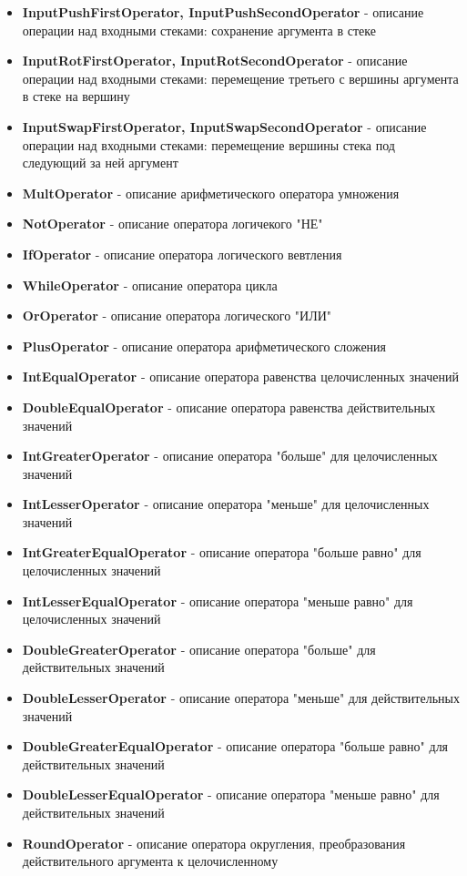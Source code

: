 \documentclass[russian,utf8,emptystyle]{eskdtext}
\begin{document}
\begin{spacing}{1.5}
\begin{itemize}
\item \textbf{InputPushFirstOperator, InputPushSecondOperator} - описание операции над входными стеками: сохранение аргумента в стеке
\item \textbf{InputRotFirstOperator, InputRotSecondOperator} -  описание операции над входными стеками: перемещение третьего с вершины аргумента в стеке на вершину
\item \textbf{InputSwapFirstOperator, InputSwapSecondOperator} - описание операции над входными стеками: перемещение вершины стека под следующий за ней аргумент
\item \textbf{MultOperator} - описание арифметического оператора умножения
\item \textbf{NotOperator} -  описание оператора логичекого "НЕ"
\item \textbf{IfOperator} - описание оператора логического вевтления
\item \textbf{WhileOperator} - описание оператора цикла
\item \textbf{OrOperator} - описание оператора логического "ИЛИ"
\item \textbf{PlusOperator} - описание оператора арифметического сложения
\item \textbf{IntEqualOperator} - описание оператора равенства целочисленных значений
\item \textbf{DoubleEqualOperator} - описание оператора равенства действительных значений
\item \textbf{IntGreaterOperator} - описание оператора "больше" для целочисленных значений
\item \textbf{IntLesserOperator} - описание оператора "меньше" для целочисленных значений
\item \textbf{IntGreaterEqualOperator} - описание оператора "больше равно" для целочисленных значений
\item \textbf{IntLesserEqualOperator} - описание оператора "меньше равно" для целочисленных значений
\item \textbf{DoubleGreaterOperator} - описание оператора "больше" для действительных значений
\item \textbf{DoubleLesserOperator} - описание оператора "меньше" для действительных значений
\item \textbf{DoubleGreaterEqualOperator} - описание оператора "больше равно" для действительных значений
\item \textbf{DoubleLesserEqualOperator} - описание оператора "меньше равно" для действительных значений
\item \textbf{RoundOperator} - описание оператора округления, преобразования действительного аргумента к целочисленному

\end{itemize}
\end{spacing}
\end{document}
